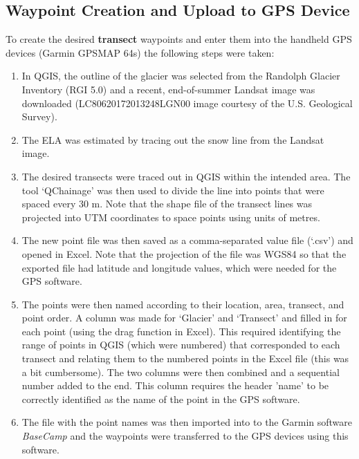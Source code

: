 \documentclass[12pt]{article}
\begin{document}
\subsection{Waypoint Creation and Upload to GPS Device}

To create the desired \textbf{transect} waypoints and enter them into the handheld GPS devices (Garmin GPSMAP 64s) the following steps were taken:
\begin{enumerate}
\item In QGIS, the outline of the glacier was selected from the Randolph Glacier Inventory (RGI 5.0) \citep{Pfeffer2014} and a recent, end-of-summer Landsat image was downloaded (LC80620172013248LGN00 image courtesy of the U.S. Geological Survey). 
\item The ELA was estimated by tracing out the snow line from the Landsat image.
\item The desired transects were traced out in QGIS within the intended area. The tool `QChainage' was then used to divide the line into points that were spaced every 30 m. Note that the shape file of the transect lines was projected into UTM coordinates to space points using units of metres. 
\item The new point file was then saved as a comma-separated value file (`.csv') and opened in Excel. Note that the projection of the file was WGS84 so that the exported file had latitude and longitude values, which were needed for the GPS software.
\item The points were then named according to their location, area, transect, and point order. A column was made for `Glacier' and `Transect' and filled in for each point (using the drag function in Excel). This required identifying the range of points in QGIS (which were numbered) that corresponded to each transect and relating them to the numbered points in the Excel file (this was a bit cumbersome). The two columns were then combined and a sequential number added to the end. This column requires the header 'name' to be correctly identified as the name of the point in the GPS software.
\item The file with the point names was then imported into to the Garmin software \textit{BaseCamp} and the waypoints were transferred to the GPS devices using this software. 
\end{enumerate}
\end{document}
